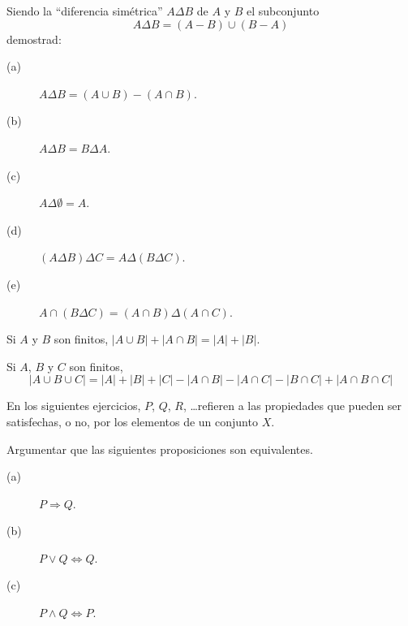 \begin{ejercicio}
    Siendo la ``diferencia simétrica'' $A\Delta B$ de $A$ y $B$ el subconjunto
    \begin{equation*}
        A\Delta B = (A-B)\cup (B-A)
    \end{equation*}
    demostrad:
    \begin{description}
        \item [(a)] $A\Delta B = (A\cup B) - (A \cap B)$.
        \item [(b)] $A\Delta B = B\Delta A$.
        \item [(c)] $A\Delta \emptyset = A$.
        \item [(d)] $(A\Delta B)\Delta C = A\Delta(B\Delta C)$.
        \item [(e)] $A\cap (B\Delta C) = (A\cap B)\Delta (A\cap C)$.
    \end{description}
\end{ejercicio}

\begin{ejercicio}
    Si $A$ y $B$ son finitos, $|A\cup B| + |A\cap B| = |A| + |B|$.
\end{ejercicio}

\begin{ejercicio}
    Si $A$, $B$ y $C$ son finitos,
    \begin{equation*}
        |A\cup B \cup C| = |A| + |B| + |C| - |A\cap B| - |A\cap C| - |B\cap C| + |A\cap B\cap C|
    \end{equation*}
\end{ejercicio}

\noindent
En los siguientes ejercicios, $P$, $Q$, $R$, \ldots refieren a las propiedades que pueden ser satisfechas, o no, por los elementos de un conjunto $X$.

\begin{ejercicio}
    Argumentar que las siguientes proposiciones son equivalentes.
    \begin{description}
        \item [(a)] $P \Longrightarrow Q$.
        \item [(b)] $P\lor Q \Longleftrightarrow Q$.
        \item [(c)] $P\land Q \Longleftrightarrow P$.
    \end{description}
\end{ejercicio}

